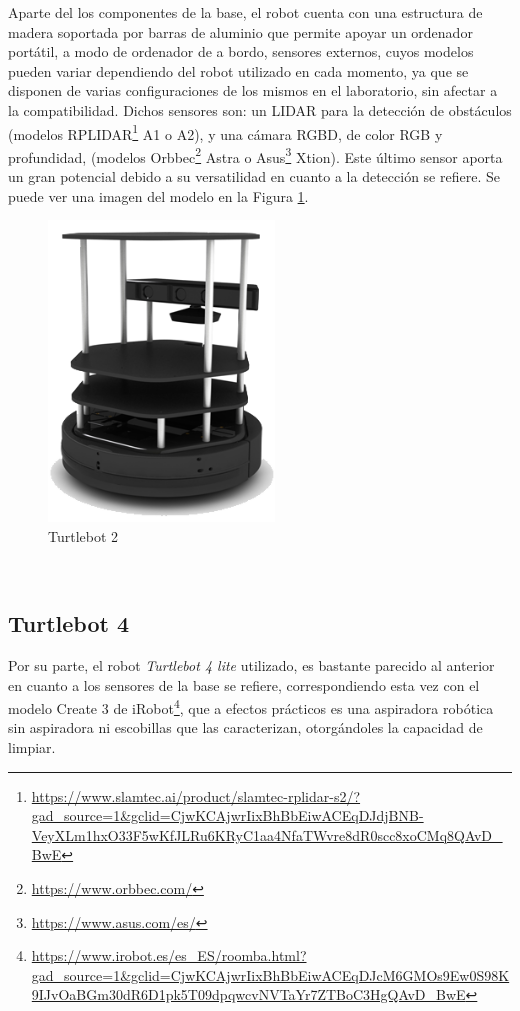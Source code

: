 Aparte del los componentes de la base, el robot cuenta con una estructura de
madera soportada por barras de aluminio que permite apoyar un ordenador
portátil, a modo de ordenador de a bordo, sensores externos, cuyos modelos
pueden variar dependiendo del robot utilizado en cada momento, ya que se
disponen de varias configuraciones de los mismos en el laboratorio, sin afectar
a la compatibilidad.
Dichos sensores son: un LIDAR para la detección de obstáculos (modelos
RPLIDAR\footnote{\url{https://www.slamtec.ai/product/slamtec-rplidar-s2/?gad_source=1&gclid=CjwKCAjwrIixBhBbEiwACEqDJdjBNB-VeyXLm1hxO33F5wKfJLRu6KRyC1aa4NfaTWvre8dR0scc8xoCMq8QAvD_BwE}}
A1 o A2), y una cámara RGBD, de color RGB y profundidad, (modelos
Orbbec\footnote{\url{https://www.orbbec.com/}} Astra o
Asus\footnote{\url{https://www.asus.com/es/}} Xtion).
Este último sensor aporta un gran potencial debido a su versatilidad en cuanto a
la detección se refiere.
Se puede ver una imagen del modelo en la Figura \ref{fig:turtlebot2}.

\begin{figure} [h!]
  \begin{center}
    \includegraphics[width=6cm]{figs/turtlebot2}
  \end{center}
  \caption{Turtlebot 2 \citep{turtlebot4}}
  \label{fig:turtlebot2}
\end{figure}\


\subsection{Turtlebot 4}
\label{sec:turtlebot4}

Por su parte, el robot \textit{Turtlebot 4 lite} utilizado, es bastante parecido
al anterior en cuanto a los sensores de la base se refiere, correspondiendo esta
vez con el modelo Create 3 de
iRobot\footnote{\url{https://www.irobot.es/es_ES/roomba.html?gad_source=1&gclid=CjwKCAjwrIixBhBbEiwACEqDJcM6GMOs9Ew0S98K9IJvOaBGm30dR6D1pk5T09dpqwcvNVTaYr7ZTBoC3HgQAvD_BwE}},
que a efectos prácticos es una aspiradora robótica sin aspiradora ni escobillas
que las caracterizan, otorgándoles la capacidad de limpiar.

